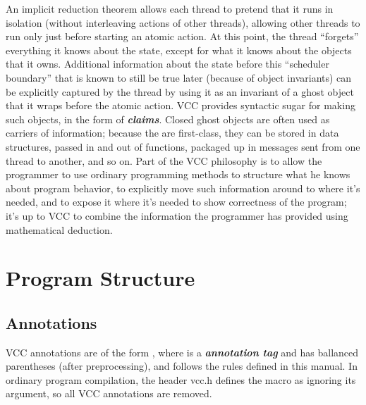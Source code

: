 \documentclass[preprint,nocopyrightspace]{sigplanconf}
\newcommand{\Def}[1]{\textit{\textbf{#1}}}
\begin{document}
An implicit reduction theorem allows each thread to pretend that it
runs in isolation (without interleaving actions of other threads),
allowing other threads to run only just before starting an atomic
action. At this point, the thread ``forgets'' everything it knows
about the state, except for what it knows about the objects that it
owns. Additional information about the state before this ``scheduler
boundary'' that is known to still be true later (because of object
invariants) can be explicitly captured by the thread by using it as an
invariant of a ghost object that it wraps before the atomic
action. VCC provides syntactic sugar for making such objects, in the
form of \Def{claims}. Closed ghost objects are often used as carriers
of information; because the are first-class, they can be stored in
data structures, passed in and out of functions, packaged up in
messages sent from one thread to another, and so on. Part of the VCC
philosophy is to allow the programmer to use ordinary programming
methods to structure what he knows about program behavior, to
explicitly move such information around to where it's needed, and to
expose it where it's needed to show correctness of the program; it's
up to VCC to combine the information the programmer has provided using
mathematical deduction.

\section{Program Structure}

\subsection{Annotations}
VCC annotations are of the form , where  is
a \Def{annotation tag} and  has ballanced parentheses
(after preprocessing), and follows the rules defined in this
manual. In ordinary program compilation, the header vcc.h defines the
macro \vcc{_} as ignoring its argument, so all VCC annotations are
removed. 
\end{document}
